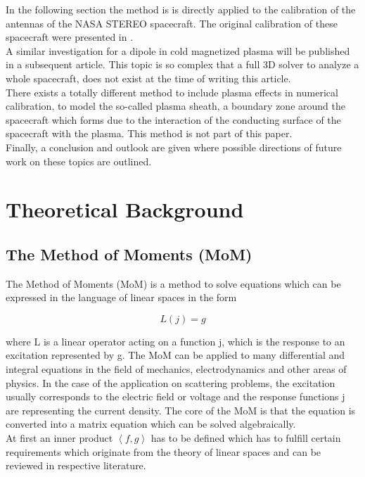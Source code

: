 \documentclass[two-column,ras]{agutex}
\begin{document}
\begin{article}
In the following section the method is is directly applied to the calibration of the antennas of the NASA STEREO spacecraft. The original calibration of these spacecraft were presented in \cite{ossi09}.\\

A similar investigation for a dipole in cold magnetized plasma will be published in a subsequent article. This topic is so complex that a full 3D solver to analyze a whole spacecraft, does not exist at the time of writing this article.\\

There exists a totally different method to include plasma effects in numerical calibration, to model the so-called plasma sheath, a boundary zone around the spacecraft which forms due to the interaction of the conducting surface of the spacecraft with the plasma. This method is not part of this paper.\\

Finally, a conclusion and outlook are given where possible directions of future work on these topics are outlined.

\section{Theoretical Background}
\subsection{The Method of Moments (MoM)}
The Method of Moments (MoM) is a method to solve equations which can be expressed in the language of linear spaces in the form

\begin{equation}\label{eq:linear_operator}
 L(j)=g
\end{equation}

where L is a linear operator acting on a function j, which is the response to an excitation represented by g. The MoM can be applied to many differential and integral equations in the field of mechanics, electrodynamics and other areas of physics. In the case of the application on scattering problems, the excitation usually corresponds to the electric field or voltage and the response functions j are representing the current density. The core of the MoM is that the equation is converted into a matrix equation which can be solved algebraically.\\

At first an inner product $\left\langle f,g\right\rangle$ has to be defined which has to fulfill certain requirements which originate from the theory of linear spaces and can be reviewed in respective literature.\\


\end{article}
\end{document}
